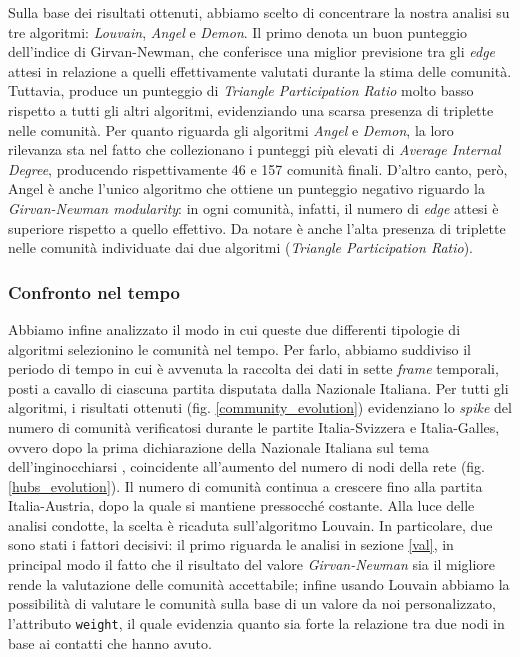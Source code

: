    Sulla base dei risultati ottenuti, abbiamo scelto di concentrare la nostra analisi su tre algoritmi: \textit{Louvain}, \textit{Angel} e \textit{Demon}. 
   Il primo denota un buon punteggio dell'indice di Girvan-Newman, che conferisce una miglior previsione tra gli \textit{edge} attesi in relazione a quelli effettivamente valutati durante la stima delle comunità. 
   Tuttavia, produce un punteggio di \textit{Triangle Participation Ratio} molto basso rispetto a tutti gli altri algoritmi, evidenziando una scarsa presenza di triplette nelle comunità.
   Per quanto riguarda gli algoritmi \textit{Angel} e \textit{Demon}, la loro rilevanza sta nel fatto che collezionano i punteggi più elevati di \textit{Average Internal Degree}, producendo rispettivamente 46 e 157 comunità finali. D'altro canto, però, Angel è anche l’unico algoritmo che ottiene un punteggio negativo riguardo la \textit{Girvan-Newman modularity}: in ogni comunità, infatti, il numero di \textit{edge} attesi è superiore rispetto a quello effettivo. Da notare è anche l'alta presenza di triplette nelle comunità individuate dai due algoritmi (\textit{Triangle Participation Ratio}). 
   
   \subsubsection{Confronto nel tempo}\label{dcd}
   Abbiamo infine analizzato il modo in cui queste due differenti tipologie di algoritmi selezionino le comunità nel tempo. 
   Per farlo, abbiamo suddiviso il periodo di tempo in cui è avvenuta la raccolta dei dati in sette \textit{frame} temporali, posti a cavallo di ciascuna partita disputata dalla Nazionale Italiana.
   Per tutti gli algoritmi, i risultati ottenuti (fig. \ref{community_evolution}) evidenziano lo \textit{spike} del numero di comunità verificatosi durante le partite Italia-Svizzera e Italia-Galles, ovvero dopo la prima dichiarazione della Nazionale Italiana sul tema dell'inginocchiarsi \cite{inginocchiobonucci}, coincidente all'aumento del numero di nodi della rete (fig. \ref{hubs_evolution}). Il numero di comunità continua a crescere fino alla partita Italia-Austria, dopo la quale si mantiene pressocché costante.
   Alla luce delle analisi condotte, la scelta è ricaduta sull'algoritmo Louvain. In particolare, due sono stati i fattori decisivi: il primo riguarda le analisi in sezione \ref{val}, in principal modo il fatto che il risultato del valore \textit{Girvan-Newman} sia il migliore rende la valutazione delle comunità accettabile; infine usando Louvain abbiamo la possibilità di valutare le comunità sulla base di un valore da noi personalizzato, l’attributo \texttt{weight}, il quale evidenzia quanto sia forte la relazione tra due nodi in base ai contatti che hanno avuto.
    
